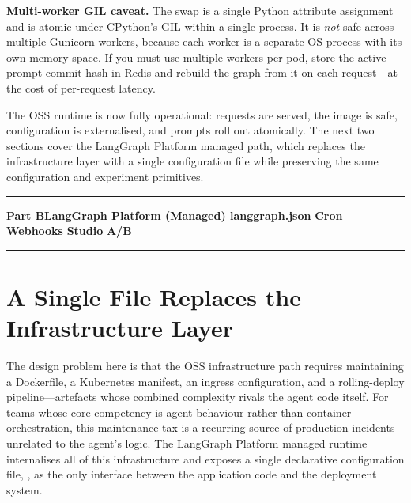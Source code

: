 \begin{warningbox}
  \textbf{Multi-worker GIL caveat.}\quad
  The  swap is a single Python attribute
  assignment and is atomic under CPython's GIL within a single process.
  It is \emph{not} safe across multiple Gunicorn workers, because each worker
  is a separate OS process with its own memory space. If you must use multiple
  workers per pod, store the active prompt commit hash in Redis and rebuild
  the graph from it on each request---at the cost of per-request latency.
\end{warningbox}

The OSS runtime is now fully operational: requests are served, the image is
safe, configuration is externalised, and prompts roll out atomically. The
next two sections cover the LangGraph Platform managed path, which replaces
the infrastructure layer with a single configuration file while preserving
the same configuration and experiment primitives.

\noindent\rule{\linewidth}{0.8pt}
\begin{center}
  \textbf{Part B\quad LangGraph Platform (Managed)\quad
    langgraph.json\,\textperiodcentered\,Cron\,\textperiodcentered\,Webhooks\,\textperiodcentered\,Studio\,\textperiodcentered\,A/B}
\end{center}
\noindent\rule{\linewidth}{0.8pt}

\section{A Single File Replaces the Infrastructure Layer}
\label{sec:platform-json}

The design problem here is that the OSS infrastructure path requires
maintaining a Dockerfile, a Kubernetes manifest, an ingress configuration,
and a rolling-deploy pipeline---artefacts whose combined complexity rivals
the agent code itself. For teams whose core competency is agent behaviour
rather than container orchestration, this maintenance tax is a recurring
source of production incidents unrelated to the agent's logic. The LangGraph
Platform managed runtime internalises all of this infrastructure and exposes
a single declarative configuration file, , as the only
interface between the application code and the deployment system.

